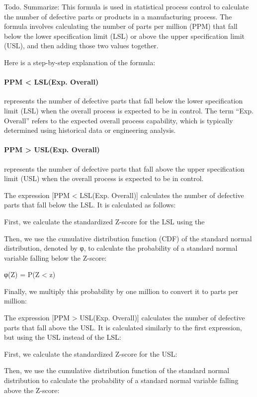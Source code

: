 \documentclass[11pt]{article}
\begin{document}
Todo. Summarize: This formula is used in statistical process control to
calculate the number of defective parts or products in a manufacturing
process. The formula involves calculating the number of parts per
million (PPM) that fall below the lower specification limit (LSL) or
above the upper specification limit (USL), and then adding those two
values together.

Here is a step-by-step explanation of the formula:

\paragraph{PPM \textless{} LSL(Exp. Overall)} represents the number of defective
parts that fall below the lower specification limit (LSL) when the
overall process is expected to be in control. The term ``Exp. Overall''
refers to the expected overall process capability, which is typically
determined using historical data or engineering analysis.

\paragraph{PPM \textgreater{} USL(Exp. Overall)} represents the number of defective
parts that fall above the upper specification limit (USL) when the
overall process is expected to be in control.

The expression {[}PPM \textless{} LSL(Exp. Overall){]} calculates the
number of defective parts that fall below the LSL. It is calculated as
follows:

First, we calculate the standardized Z-score for the LSL using the


Then, we use the cumulative distribution function (CDF) of the standard
normal distribution, denoted by φ, to calculate the probability of a
standard normal variable falling below the Z-score:

φ(Z) = P(Z \textless{} z)

Finally, we multiply this probability by one million to convert it to
parts per million:

The expression {[}PPM \textgreater{} USL(Exp. Overall){]} calculates the
number of defective parts that fall above the USL. It is calculated
similarly to the first expression, but using the USL instead of the LSL:

First, we calculate the standardized Z-score for the USL:

Then, we use the cumulative distribution function of the standard normal
distribution to calculate the probability of a standard normal variable
falling above the Z-score:
\end{document}
